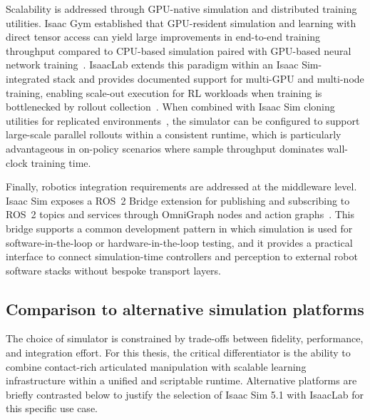 
Scalability is addressed through GPU-native simulation and distributed training utilities. Isaac Gym established that GPU-resident simulation and learning with direct tensor access can yield large improvements in end-to-end training throughput compared to CPU-based simulation paired with GPU-based neural network training~\cite{Makoviychuk2021IsaacGym}. IsaacLab extends this paradigm within an Isaac Sim-integrated stack and provides documented support for multi-\ac{GPU} and multi-node training, enabling scale-out execution for \ac{RL} workloads when training is bottlenecked by rollout collection~\cite{Mittal2025IsaacLab,isaaclab_multi_gpu_multinode}. When combined with Isaac Sim cloning utilities for replicated environments~\cite{nvidia_isaac_sim_510_extensions_api}, the simulator can be configured to support large-scale parallel rollouts within a consistent runtime, which is particularly advantageous in on-policy scenarios where sample throughput dominates wall-clock training time.

Finally, robotics integration requirements are addressed at the middleware level. Isaac Sim exposes a \ac{ROS}~2 Bridge extension for publishing and subscribing to \ac{ROS}~2 topics and services through OmniGraph nodes and action graphs~\cite{nvidia_isaac_sim_510_extensions_api}. This bridge supports a common development pattern in which simulation is used for software-in-the-loop or hardware-in-the-loop testing, and it provides a practical interface to connect simulation-time controllers and perception to external robot software stacks without bespoke transport layers.

\subsection{Comparison to alternative simulation platforms}
The choice of simulator is constrained by trade-offs between fidelity, performance, and integration effort. For this thesis, the critical differentiator is the ability to combine contact-rich articulated manipulation with scalable learning infrastructure within a unified and scriptable runtime. Alternative platforms are briefly contrasted below to justify the selection of Isaac Sim 5.1 with IsaacLab for this specific use case.

